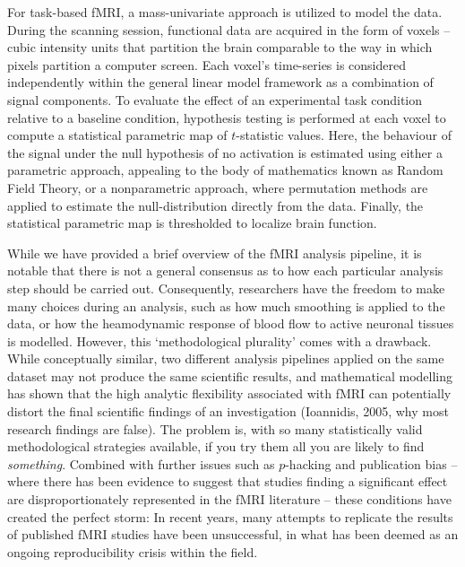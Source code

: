 For task-based fMRI, a mass-univariate approach is utilized to model the data. During the scanning session, functional data are acquired in the form of voxels -- cubic intensity units that partition the brain comparable to the way in which pixels partition a computer screen. Each voxel's time-series is considered independently within the general linear model framework as a combination of signal components. To evaluate the effect of an experimental task condition relative to a baseline condition, hypothesis testing is performed at each voxel to compute a statistical parametric map of $t$-statistic values. Here, the behaviour of the signal under the null hypothesis of no activation is estimated using either a parametric approach, appealing to the body of mathematics known as Random Field Theory, or a nonparametric approach, where permutation methods are applied to estimate the null-distribution directly from the data. Finally, the statistical parametric map is thresholded to localize brain function. 

While we have provided a brief overview of the fMRI analysis pipeline, it is notable that there is not a general consensus as to how each particular analysis step should be carried out. Consequently, researchers have the freedom to make many choices during an analysis, such as how much smoothing is applied to the data, or how the heamodynamic response of blood flow to active neuronal tissues is modelled. However, this `methodological plurality' comes with a drawback. While conceptually similar, two different analysis pipelines applied on the same dataset may not produce the same scientific results, and mathematical modelling has shown that the high analytic flexibility associated with fMRI can potentially distort the final scientific findings of an investigation (Ioannidis, 2005, why most research findings are false). The problem is, with so many statistically valid methodological strategies available, if you try them all you are likely to find \textit{something}. Combined with further issues such as $p$-hacking and publication bias -- where there has been evidence to suggest that studies finding a significant effect are disproportionately represented in the fMRI literature -- these conditions have created the perfect storm: In recent years, many attempts to replicate the results of published fMRI studies have been unsuccessful, in what has been deemed as an ongoing reproducibility crisis within the field. 

